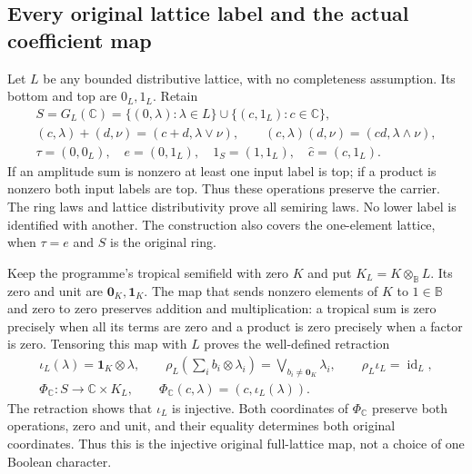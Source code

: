 \subsection{Every original lattice label and the actual coefficient map}

Let $L$ be any bounded distributive lattice, with no completeness
assumption. Its bottom and top are $0_L,1_L$. Retain
\begin{equation}\tag{THS16}
\begin{gathered}
 S=G_L(\mathbb C)=\{(0,\lambda):\lambda\in L\}
                 \cup\{(c,1_L):c\in\mathbb C\},\\
 (c,\lambda)+(d,\nu)=(c+d,\lambda\vee\nu),\qquad
 (c,\lambda)(d,\nu)=(cd,\lambda\wedge\nu),\\
 \tau=(0,0_L),\quad e=(0,1_L),\quad
 1_S=(1,1_L),\quad\widehat c=(c,1_L).
\end{gathered}
\end{equation}
If an amplitude sum is nonzero at least one input label is top;
if a product is nonzero both input labels are top. Thus these
operations preserve the carrier. The ring laws and lattice
distributivity prove all semiring laws. No lower label is
identified with another. The construction also covers the
one-element lattice, when $\tau=e$ and $S$ is the original ring.

Keep the programme's tropical semifield with zero $K$ and put
$K_L=K\otimes_{\mathbb B}L$. Its zero and unit are
$\mathbf0_K,\mathbf1_K$. The map that sends nonzero elements
of $K$ to $1\in\mathbb B$ and zero to zero preserves addition
and multiplication: a tropical sum is zero precisely when all
its terms are zero and a product is zero precisely when a
factor is zero. Tensoring this map with $L$ proves the
well-defined retraction
\begin{equation}\tag{THS17}
\begin{gathered}
 \iota_L(\lambda)=\mathbf1_K\otimes\lambda,\qquad
 \rho_L\left(\sum_i b_i\otimes\lambda_i\right)
       =\bigvee_{b_i\ne\mathbf0_K}\lambda_i,\qquad
 \rho_L\iota_L=\operatorname{id}_L,\\
 \Phi_{\mathbb C}:S\longrightarrow\mathbb C\times K_L,
 \qquad\Phi_{\mathbb C}(c,\lambda)=(c,\iota_L(\lambda)).
\end{gathered}
\end{equation}
The retraction shows that $\iota_L$ is injective. Both coordinates
of $\Phi_{\mathbb C}$ preserve both operations, zero and unit,
and their equality determines both original coordinates.
Thus this is the injective original full-lattice map, not a
choice of one Boolean character.

